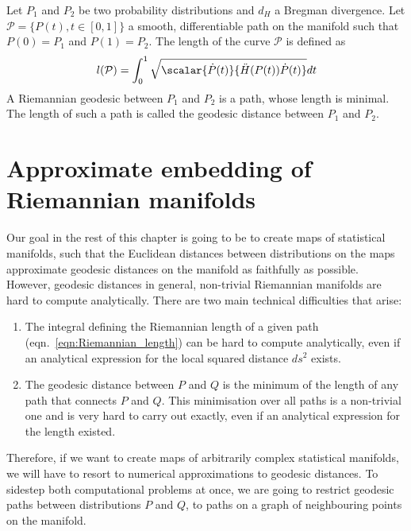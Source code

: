 \begin{definition}
	Let $P_1$ and $P_2$ be two probability distributions and $d_H$ a Bregman divergence. Let $\mathcal{P}=\{P(t),t\in[0,1]\}$ a smooth, differentiable path on the manifold such that $P(0)=P_1$ and $P(1)=P_2$. The length of the curve $\mathcal{P}$ is defined as
	\begin{equation}
		l(\mathcal{P}) = \int_{0}^{1} \sqrt{ \scalar{\dot{P}(t)}{\ddot{H}(P(t))\dot{P}(t)}} dt \label{eqn:Riemannian_length}
	\end{equation}
	A Riemannian geodesic between $P_1$ and $P_2$ is a path, whose length is minimal. The length of such a path is called the geodesic distance between $P_1$ and $P_2$.
\end{definition}


\section{Approximate embedding of Riemannian manifolds}

Our goal in the rest of this chapter is going to be to create maps of statistical manifolds, such that the Euclidean distances between distributions on the maps approximate geodesic distances on the manifold as faithfully as possible. However, geodesic distances in general, non-trivial Riemannian manifolds are hard to compute analytically. There are two main technical difficulties that arise:

\begin{enumerate}
	\item The integral defining the Riemannian length of a given path (eqn.\ \eqref{eqn:Riemannian_length}) can be hard to compute analytically, even if an analytical expression for the local squared distance $ds^2$ exists.
	\item The geodesic distance between $P$ and $Q$ is the minimum of the length of any path that connects $P$ and $Q$. This minimisation over all paths is a non-trivial one and is very hard to carry out exactly, even if an analytical expression for the length existed.
\end{enumerate}

Therefore, if we want to create maps of arbitrarily complex statistical manifolds, we will have to resort to numerical approximations to geodesic distances. To sidestep both computational problems at once, we are going to restrict geodesic paths between distributions $P$ and $Q$, to paths on a graph of neighbouring points on the manifold.

